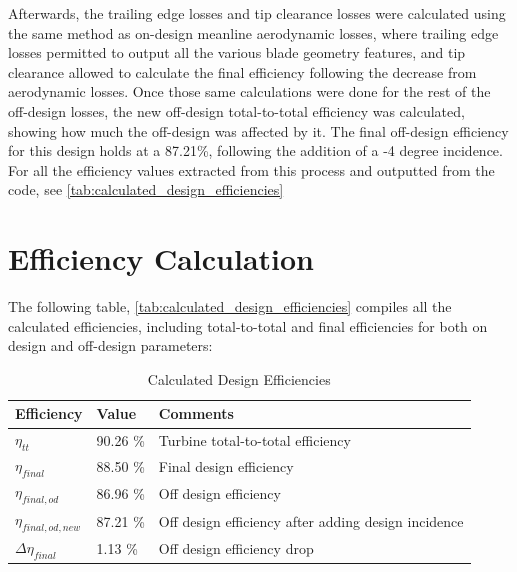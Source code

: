 \documentclass[12pt, letter]{report}
\begin{document}
Afterwards, the trailing edge losses and tip clearance losses were calculated using the same method as on-design meanline aerodynamic losses, where trailing edge losses permitted to output all the various blade geometry features, and tip clearance allowed to calculate the final efficiency following the decrease from aerodynamic losses. Once those same calculations were done for the rest of the off-design losses, the new off-design total-to-total efficiency was calculated, showing how much the off-design was affected by it. The final off-design efficiency for this design holds at a 87.21\%, following the addition of a -4 degree incidence. For all the efficiency values extracted from this process and outputted from the code, see \autoref{tab:calculated_design_efficiencies}





\section{Efficiency Calculation}

The following table, \autoref{tab:calculated_design_efficiencies} compiles all the calculated efficiencies, including total-to-total and final efficiencies for both on design and off-design parameters:

\begin{table}[ht]
\centering
\caption{Calculated Design Efficiencies}
\label{tab:calculated_design_efficiencies}
\begin{tabular}{|l|l|l|}
\hline
\textbf{Efficiency}                 & \textbf{Value} & \textbf{Comments}\\ \hline
$\eta_{tt}$                & 90.26 \% &    Turbine total-to-total efficiency     \\ \hline
$\eta_{final}$             & 88.50 \% &    Final design efficiency     \\ \hline
$\eta_{final,od}$          & 86.96 \% &    Off design efficiency     \\ \hline
$\eta_{final,od,new}$      & 87.21 \% &    Off design efficiency after adding design incidence     \\ \hline
$\Delta\eta_{final}$       & 1.13 \% &    Off design efficiency drop    \\ \hline
\end{tabular}

\end{table}
\clearpage

\end{document}
